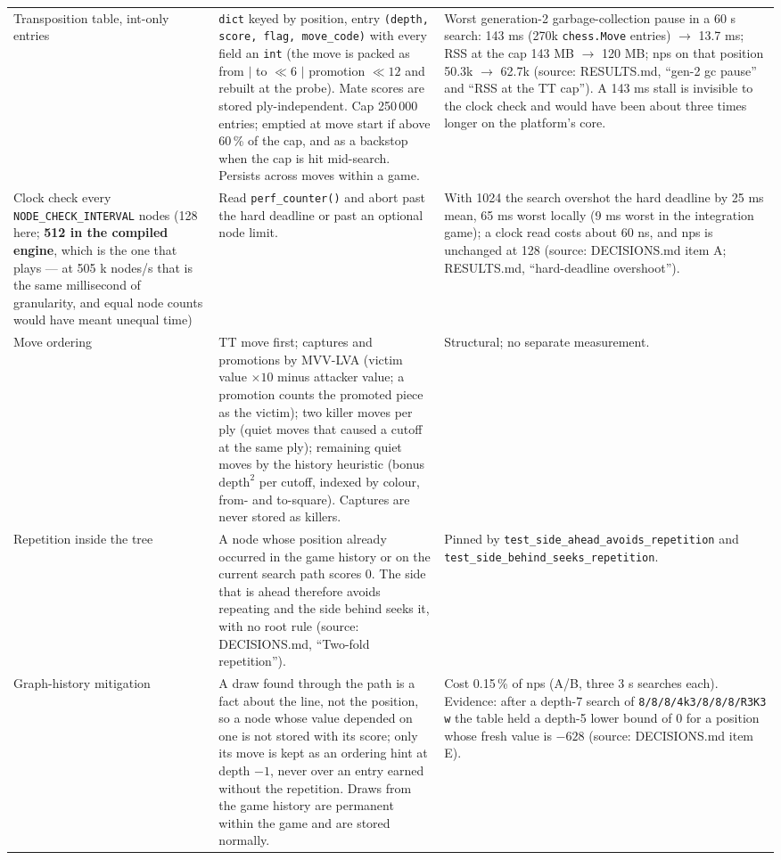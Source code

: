 \documentclass[11pt,a4paper]{article}
\newcommand{\src}[1]{{\small(source: #1)}}
\newcommand{\code}[1]{\texttt{#1}}
\begin{document}
{\begin{longtable}{@{}>{\raggedright\arraybackslash}p{3.4cm}>{\raggedright\arraybackslash}p{5.2cm}>{\raggedright\arraybackslash}p{5.9cm}@{}}
Transposition table, int-only entries & \code{dict} keyed by position, entry \code{(depth, score, flag, move\_code)} with every field an \code{int} (the move is packed as from $|$ to $\ll 6$ $|$ promotion $\ll 12$ and rebuilt at the probe). Mate scores are stored ply-independent. Cap 250\,000 entries; emptied at move start if above 60\,\% of the cap, and as a backstop when the cap is hit mid-search. Persists across moves within a game. & Worst generation-2 garbage-collection pause in a 60 s search: 143 ms (270k \code{chess.Move} entries) $\to$ 13.7 ms; RSS at the cap 143 MB $\to$ 120 MB; nps on that position 50.3k $\to$ 62.7k \src{RESULTS.md, ``gen-2 gc pause'' and ``RSS at the TT cap''}. A 143 ms stall is invisible to the clock check and would have been about three times longer on the platform's core. \\
Clock check every \code{NODE\_CHECK\_INTERVAL} nodes (128 here; \textbf{512 in the compiled engine}, which is the one that plays --- at 505 k nodes/s that is the same millisecond of granularity, and equal node counts would have meant unequal time) & Read \code{perf\_counter()} and abort past the hard deadline or past an optional node limit. & With 1024 the search overshot the hard deadline by 25 ms mean, 65 ms worst locally (9 ms worst in the integration game); a clock read costs about 60 ns, and nps is unchanged at 128 \src{DECISIONS.md item A; RESULTS.md, ``hard-deadline overshoot''}. \\
Move ordering & TT move first; captures and promotions by MVV-LVA (victim value $\times 10$ minus attacker value; a promotion counts the promoted piece as the victim); two killer moves per ply (quiet moves that caused a cutoff at the same ply); remaining quiet moves by the history heuristic (bonus $\mathrm{depth}^2$ per cutoff, indexed by colour, from- and to-square). Captures are never stored as killers. & Structural; no separate measurement. \\
Repetition inside the tree & A node whose position already occurred in the game history or on the current search path scores 0. The side that is ahead therefore avoids repeating and the side behind seeks it, with no root rule \src{DECISIONS.md, ``Two-fold repetition''}. & Pinned by \code{test\_side\_ahead\_avoids\_repetition} and \code{test\_side\_behind\_seeks\_repetition}. \\
Graph-history mitigation & A draw found through the path is a fact about the line, not the position, so a node whose value depended on one is not stored with its score; only its move is kept as an ordering hint at depth $-1$, never over an entry earned without the repetition. Draws from the game history are permanent within the game and are stored normally. & Cost 0.15\,\% of nps (A/B, three 3 s searches each). Evidence: after a depth-7 search of \code{8/8/8/4k3/8/8/8/R3K3 w} the table held a depth-5 lower bound of 0 for a position whose fresh value is $-628$ \src{DECISIONS.md item E}. \\

\end{longtable}}
\end{document}
